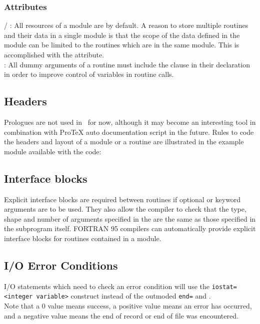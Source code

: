 \subsubsection{Attributes}

 / :
All resources of a module are  by default.
A reason to store multiple routines and their data in a single module is that
the scope of the data defined in the module can be limited to the routines which are in the same module.
This is accomplished with the  attribute. \\
:
All dummy arguments of a routine must include the  clause in their declaration in order to
improve control of variables in routine calls.

\subsection{Headers}

Prologues are not used in \NEMO\ for now, although it may become an interesting tool in combination with
ProTeX auto documentation script in the future.
Rules to code the headers and layout of a module or a routine are illustrated in the example module available with
the code: 

\subsection{Interface blocks}

Explicit interface blocks are required between routines if optional or keyword arguments are to be used.
They also allow the compiler to check that the type, shape and number of arguments specified in the 
are the same as those specified in the subprogram itself.
FORTRAN 95 compilers can automatically provide explicit interface blocks for routines contained in a module.

\subsection{I/O Error Conditions}

I/O statements which need to check an error condition will use the \texttt{iostat=<integer variable>} construct
instead of the outmoded \texttt{end=} and . \\
Note that a 0 value means success, a positive value means an error has occurred, and
a negative value means the end of record or end of file was encountered.

